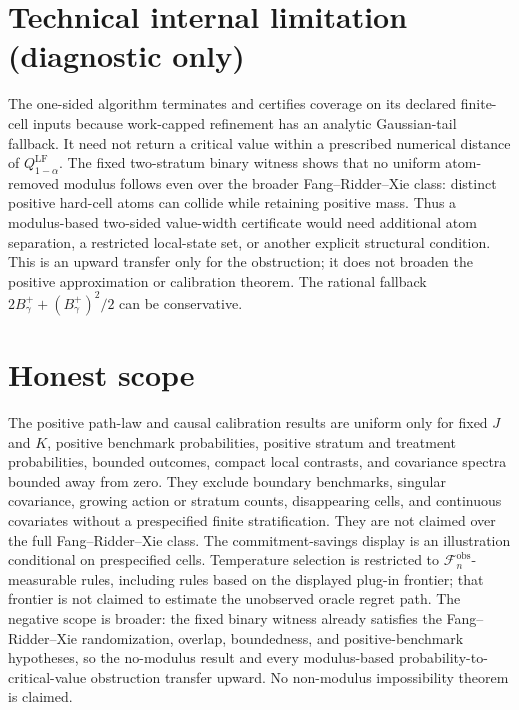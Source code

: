 \documentclass{article}
\begin{document}
\section*{Technical internal limitation (diagnostic only)}

The one-sided algorithm terminates and certifies coverage on its declared finite-cell inputs because work-capped refinement has an analytic Gaussian-tail fallback. It need not return a critical value within a prescribed numerical distance of \(Q_{1-\alpha}^{\mathrm{LF}}\). The fixed two-stratum binary witness shows that no uniform atom-removed modulus follows even over the broader Fang--Ridder--Xie class: distinct positive hard-cell atoms can collide while retaining positive mass. Thus a modulus-based two-sided value-width certificate would need additional atom separation, a restricted local-state set, or another explicit structural condition. This is an upward transfer only for the obstruction; it does not broaden the positive approximation or calibration theorem. The rational fallback \(2B_\gamma^++(B_\gamma^+)^2/2\) can be conservative.

\section{Honest scope}

The positive path-law and causal calibration results are uniform only for fixed \(J\) and \(K\), positive benchmark probabilities, positive stratum and treatment probabilities, bounded outcomes, compact local contrasts, and covariance spectra bounded away from zero. They exclude boundary benchmarks, singular covariance, growing action or stratum counts, disappearing cells, and continuous covariates without a prespecified finite stratification. They are not claimed over the full Fang--Ridder--Xie class. The commitment-savings display is an illustration conditional on prespecified cells. Temperature selection is restricted to \(\mathcal F_n^{\mathrm{obs}}\)-measurable rules, including rules based on the displayed plug-in frontier; that frontier is not claimed to estimate the unobserved oracle regret path. The negative scope is broader: the fixed binary witness already satisfies the Fang--Ridder--Xie randomization, overlap, boundedness, and positive-benchmark hypotheses, so the no-modulus result and every modulus-based probability-to-critical-value obstruction transfer upward. No non-modulus impossibility theorem is claimed.
\end{document}
